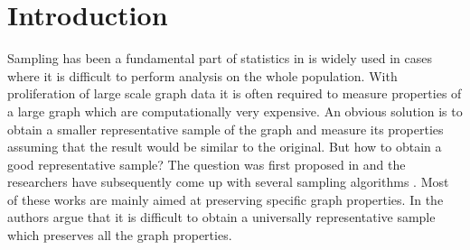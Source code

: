 \vspace{-3mm}

\section{Introduction}


Sampling has been a fundamental part of statistics in is widely used in cases where it is difficult to perform analysis on the whole population. With proliferation of large scale graph data it is often required to measure properties of a large graph which are computationally very expensive. An obvious solution is to obtain a smaller representative sample of the graph and measure its properties assuming that the result would be similar to the original. But how to obtain a good representative sample? The question was first proposed in \cite{leskovec2006sampling} and the researchers have subsequently come up with several sampling algorithms \cite{ahmed2010reconsidering,maiya2010sampling,rasti2009respondent,ribeiro2010estimating}. Most of these works are mainly aimed at preserving specific graph properties. In \cite{maiya2010sampling} the authors argue that it is difficult to obtain a universally representative sample which preserves all the graph properties. 

